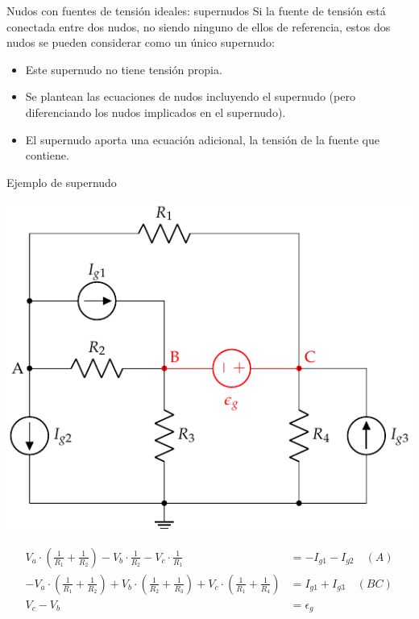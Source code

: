 \documentclass[aspectratio=169, usenames,svgnames,dvipsnames]{beamer}
\begin{document}
\begin{frame}[label={sec:org39b885a}]{Nudos con fuentes de tensión ideales: supernudos}
Si la fuente de tensión está conectada entre dos nudos, no siendo ninguno de ellos de referencia, estos dos nudos se pueden considerar como un único \alert{supernudo}:
\begin{itemize}
\item Este supernudo no tiene tensión propia.
\item Se plantean las ecuaciones de nudos incluyendo el supernudo (pero diferenciando los nudos implicados en el supernudo).
\item El supernudo aporta una ecuación adicional, la tensión de la fuente que contiene.
\end{itemize}
\end{frame}


\begin{frame}[label={sec:orgfb64730}]{Ejemplo de supernudo}
\begin{center}
\includegraphics[height=0.5\textheight]{../figs/supernudo.pdf}
\end{center}

\begin{align*}
  V_a\cdot (\frac{1}{R_1} + \frac{1}{R_2}) - V_b \cdot \frac{1}{R_2} - V_c \cdot \frac{1}{R_1} &= -I_{g1} - I_{g2} \quad (A)\\
  - V_a\cdot (\frac{1}{R_1} + \frac{1}{R_2}) + V_b \cdot (\frac{1}{R_2} + \frac{1}{R_3}) + V_c \cdot (\frac{1}{R_1} + \frac{1}{R_4}) &= I_{g1} + I_{g3} \quad (BC)\\
  V_c - V_b &= \epsilon_g
\end{align*}
\end{frame}
\end{document}
